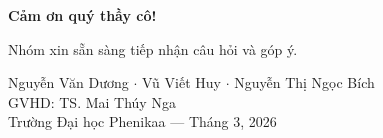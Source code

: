 \documentclass[aspectratio=169,10pt]{beamer}
\begin{document}
\begin{frame}[plain]
\begin{center}
\vspace{2cm}
{\Huge\color{phenikaa}\textbf{Cảm ơn quý thầy cô!}}

\vspace{1cm}
{\large Nhóm xin sẵn sàng tiếp nhận câu hỏi và góp ý.}

\vspace{1.5cm}
{\small
Nguyễn Văn Dương $\cdot$ Vũ Viết Huy $\cdot$ Nguyễn Thị Ngọc Bích\\[4pt]
GVHD: TS. Mai Thúy Nga\\[4pt]
Trường Đại học Phenikaa --- Tháng 3, 2026
}
\end{center}
\end{frame}
\end{document}
